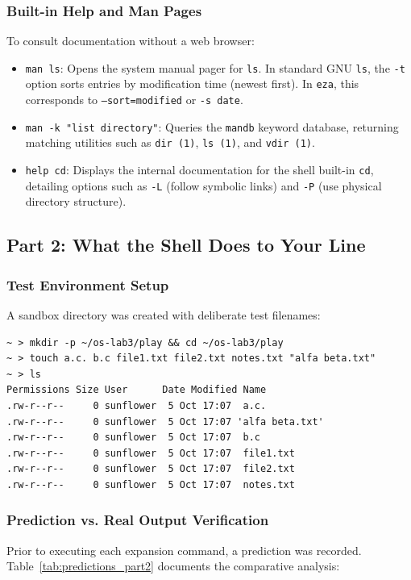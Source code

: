 \documentclass[12pt,a4paper]{article}
\begin{document}
\subsubsection{Built-in Help and Man Pages}
To consult documentation without a web browser:
\begin{itemize}
    \item \texttt{man ls}: Opens the system manual pager for \texttt{ls}. In standard GNU \texttt{ls}, the \texttt{-t} option sorts entries by modification time (newest first). In \texttt{eza}, this corresponds to \texttt{--sort=modified} or \texttt{-s date}.
    \item \texttt{man -k "list directory"}: Queries the \texttt{mandb} keyword database, returning matching utilities such as \texttt{dir (1)}, \texttt{ls (1)}, and \texttt{vdir (1)}.
    \item \texttt{help cd}: Displays the internal documentation for the shell built-in \texttt{cd}, detailing options such as \texttt{-L} (follow symbolic links) and \texttt{-P} (use physical directory structure).
\end{itemize}

\subsection{Part 2: What the Shell Does to Your Line}

\subsubsection{Test Environment Setup}
A sandbox directory was created with deliberate test filenames:
\begin{lstlisting}[style=consolestyle, caption={Creating test files in the sandbox directory}]
~ > mkdir -p ~/os-lab3/play && cd ~/os-lab3/play
~ > touch a.c. b.c file1.txt file2.txt notes.txt "alfa beta.txt"
~ > ls
Permissions Size User      Date Modified Name
.rw-r--r--     0 sunflower  5 Oct 17:07  a.c.
.rw-r--r--     0 sunflower  5 Oct 17:07 'alfa beta.txt'
.rw-r--r--     0 sunflower  5 Oct 17:07  b.c
.rw-r--r--     0 sunflower  5 Oct 17:07  file1.txt
.rw-r--r--     0 sunflower  5 Oct 17:07  file2.txt
.rw-r--r--     0 sunflower  5 Oct 17:07  notes.txt
\end{lstlisting}

\subsubsection{Prediction vs. Real Output Verification}
Prior to executing each expansion command, a prediction was recorded. Table~\ref{tab:predictions_part2} documents the comparative analysis:
\end{document}
